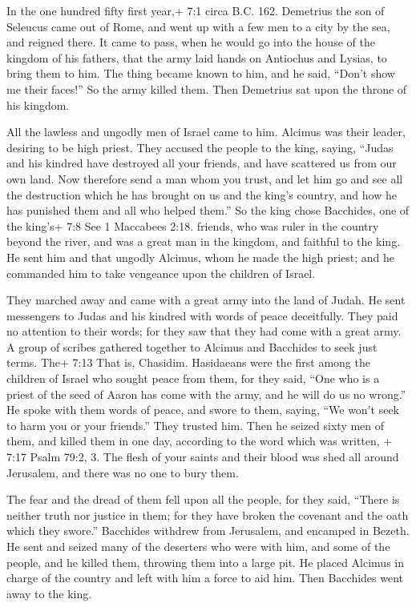  In the one hundred fifty first year,+ 7:1 circa B.C. 162.
Demetrius the son of Seleucus came out of Rome, and went up with a few
men to a city by the sea, and reigned there.  It came to
pass, when he would go into the house of the kingdom of his fathers,
that the army laid hands on Antiochus and Lysias, to bring them to him.
 The thing became known to him, and he said, ``Don't show me
their faces!''  So the army killed them. Then Demetrius sat
upon the throne of his kingdom.

 All the lawless and ungodly men of Israel came to him.
Alcimus was their leader, desiring to be high priest.  They
accused the people to the king, saying, ``Judas and his kindred have
destroyed all your friends, and have scattered us from our own land.
 Now therefore send a man whom you trust, and let him go and
see all the destruction which he has brought on us and the king's
country, and how he has punished them and all who helped them.''
 So the king chose Bacchides, one of the king's+ 7:8 See 1
Maccabees 2:18. friends, who was ruler in the country beyond the river,
and was a great man in the kingdom, and faithful to the king.
 He sent him and that ungodly Alcimus, whom he made the high
priest; and he commanded him to take vengeance upon the children of
Israel.

 They marched away and came with a great army into the land
of Judah. He sent messengers to Judas and his kindred with words of
peace deceitfully.  They paid no attention to their words;
for they saw that they had come with a great army.  A group
of scribes gathered together to Alcimus and Bacchides to seek just
terms.  The+ 7:13 That is, Chasidim. Hasidaeans were the
first among the children of Israel who sought peace from them,
 for they said, ``One who is a priest of the seed of Aaron
has come with the army, and he will do us no wrong.''  He
spoke with them words of peace, and swore to them, saying, ``We won't
seek to harm you or your friends.''  They trusted him. Then
he seized sixty men of them, and killed them in one day, according to
the word which was written,  + 7:17 Psalm 79:2, 3. The
flesh of your saints and their blood was shed all around Jerusalem, and
there was no one to bury them.

 The fear and the dread of them fell upon all the people,
for they said, ``There is neither truth nor justice in them; for they
have broken the covenant and the oath which they swore.'' 
Bacchides withdrew from Jerusalem, and encamped in Bezeth. He sent and
seized many of the deserters who were with him, and some of the people,
and he killed them, throwing them into a large pit.  He
placed Alcimus in charge of the country and left with him a force to aid
him. Then Bacchides went away to the king.

